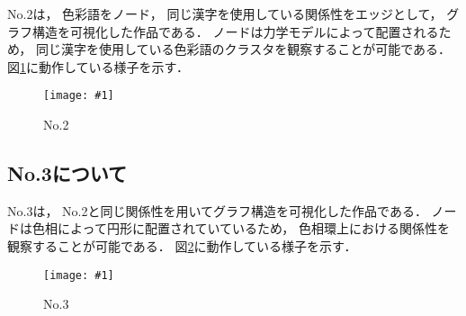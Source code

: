 \documentclass[a4j,twocolumn]{ujarticle} %
\newcommand{\workname}{緋色の習作}
\newcommand{\colorname}{色彩語}
\newcommand{\colorkanji}{色彩漢字}
\newcommand{\recallcolor}{色イメージ}
\newcommand{\mysubsection}[1]{\vspace{-18pt}\subsection{#1}}
\newcommand{\myfigure}[3]{
\begin{figure}[htbp]
  \begin{center}
    \texttt{[image: \#1]}
    \caption{#2}
    \vspace{-2zh}
    \label{#3}
  \end{center}
\end{figure}
}
\begin{document}
No.2は，
\colorname{}をノード，
同じ漢字を使用している関係性をエッジとして，
グラフ構造を可視化した作品である．
ノードは力学モデルによって配置されるため，
同じ漢字を使用している\colorname{}のクラスタを観察することが可能である．
図\ref{no2}に動作している様子を示す．

\myfigure{fig/kanji-color-graph.eps}{No.2}{no2}

\mysubsection{No.3について}

No.3は，
No.2と同じ関係性を用いてグラフ構造を可視化した作品である．
ノードは色相によって円形に配置されていているため，
色相環上における関係性を観察することが可能である．
図\ref{no3}に動作している様子を示す．

\myfigure{fig/kanji-circle-color-graph.eps}{No.3}{no3}

% 
% 
% 



\end{document}
